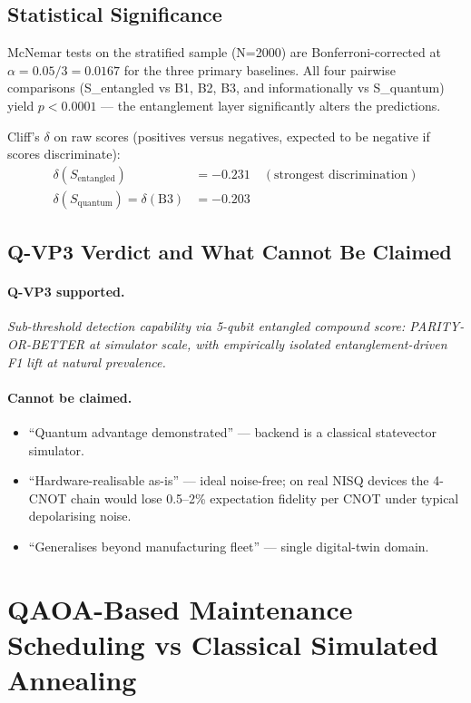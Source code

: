 \subsection{Statistical Significance}

McNemar tests on the stratified sample (N=2000) are Bonferroni-corrected at $\alpha = 0.05 / 3 = 0.0167$ for the three primary baselines. All four pairwise comparisons (S\_entangled vs B1, B2, B3, and informationally vs S\_quantum) yield $p < 0.0001$ --- the entanglement layer significantly alters the predictions.

Cliff's $\delta$ on raw scores (positives versus negatives, expected to be negative if scores discriminate):
\begin{align*}
\delta(S_{\text{entangled}}) &= -0.231 \quad (\text{strongest discrimination}) \\
\delta(S_{\text{quantum}}) = \delta(\text{B3}) &= -0.203
\end{align*}

\subsection{Q-VP3 Verdict and What Cannot Be Claimed}

\paragraph{Q-VP3 supported.} \emph{Sub-threshold detection capability via 5-qubit entangled compound score: PARITY-OR-BETTER at simulator scale, with empirically isolated entanglement-driven F1 lift at natural prevalence.}

\paragraph{Cannot be claimed.}
\begin{itemize}
    \item ``Quantum advantage demonstrated'' --- backend is a classical statevector simulator.
    \item ``Hardware-realisable as-is'' --- ideal noise-free; on real NISQ devices the 4-CNOT chain would lose 0.5--2\% expectation fidelity per CNOT under typical depolarising noise.
    \item ``Generalises beyond manufacturing fleet'' --- single digital-twin domain.
\end{itemize}

\section{QAOA-Based Maintenance Scheduling vs Classical Simulated Annealing}

